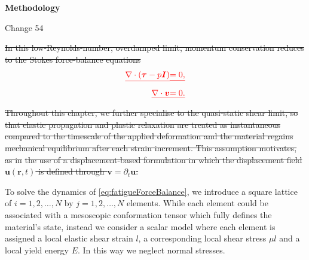 \documentclass[asymmetricmargins]{library/duthesis}%
\newcommand{\DiffReportBodyFont}{\small}
\newcommand{\DiffReportLocationFont}{\large\bfseries}
\newcommand{\DiffReportMetaFont}{\small\ttfamily}
\newcommand{\DiffReportLocation}[1]{%
  \Needspace{4\baselineskip}%
  \par\medskip
  {\DiffReportLocationFont #1\par}
}
\newcommand{\DiffReportChange}[1]{%
  \Needspace{4\baselineskip}%
  \par\smallskip
  {\DiffReportMetaFont Change #1\par}
  \smallskip
}
\newenvironment{DiffReportContent}
  {\begingroup\DiffReportBodyFont}
  {\par\endgroup\medskip}
\providecommand{\DIFdel}[1]{{\protect\color{red}\sout{#1}}}                      %
\providecommand{\DIFaddbegin}{} %
\providecommand{\DIFdelbegin}{} %
\providecommand{\DIFdelend}{} %
\begin{document}
\DiffReportLocation{Methodology}
\DiffReportChange{54}
\begin{DiffReportContent}
\DIFdelbegin \DIFdel{In this low-Reynolds-number, overdamped limit, momentum conservation reduces to the Stokes force-balance equations
}%
\begin{eqnarray*}
\DIFdel{\nabla \cdot (\bm{\tau} - p\bm{I}) }&\DIFdel{= 0, }\\
\DIFdel{\nabla \cdot \bm{v} }&\DIFdel{= 0.
}\end{eqnarray*}%
\DIFdel{Throughout this chapter, we further specialise to the quasi-static shear limit, so that elastic propagation and plastic relaxation are treated as instantaneous compared to the timescale of the applied deformation and the material regains mechanical equilibrium after each strain increment. This assumption motivates, as in }%
\DIFdel{the use of a displacement-based formulation in which the displacement field $\bm{u}(\bm{r},t)$ is defined through $\bm{v} = \partial_t \bm{u}$.
}%

\DIFdelend To solve the dynamics of \cref{eq:fatigueForceBalance}, we introduce a square lattice of $i=1,2,\ldots,N$ by $j=1,2,\ldots,N$ elements. While each element could be associated with a mesoscopic conformation tensor which fully defines the material's state, instead we consider a scalar model where each element is assigned a local elastic shear strain $l$, a corresponding local shear stress $\mu l$ and a local yield energy $E$. In this way we neglect normal stresses.
\DIFaddbegin 


\end{DiffReportContent}
\end{document}
